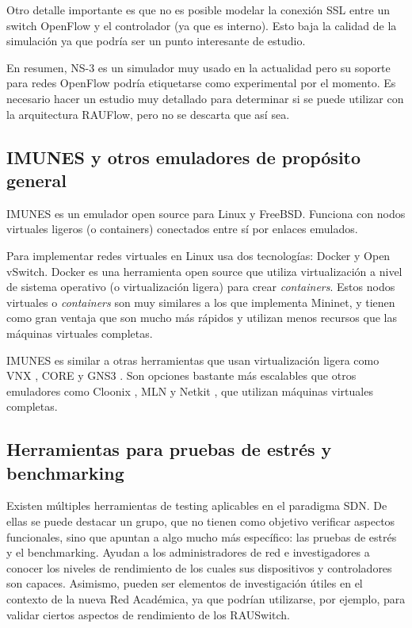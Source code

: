 Otro detalle importante es que no es posible modelar la conexión SSL entre un switch OpenFlow y el controlador (ya que es interno). Esto baja la calidad de la simulación ya que podría ser un punto interesante de estudio.

En resumen, NS-3 es un simulador muy usado en la actualidad pero su soporte para redes OpenFlow podría etiquetarse como experimental por el momento. Es necesario hacer un estudio muy detallado para determinar si se puede utilizar con la arquitectura RAUFlow, pero no se descarta que así sea.

\subsection{IMUNES y otros emuladores de propósito general}
IMUNES \cite{imunes} es un emulador open source para Linux y FreeBSD. Funciona con nodos virtuales ligeros (o containers) conectados entre sí por enlaces emulados.

Para implementar redes virtuales en Linux usa dos tecnologías: Docker y Open vSwitch. Docker es una herramienta open source que utiliza virtualización a nivel de sistema operativo (o virtualización ligera) para crear \textit{containers}. Estos nodos virtuales o \textit{containers} son muy similares a los que implementa Mininet, y tienen como gran ventaja que son mucho más rápidos y utilizan menos recursos que las máquinas virtuales completas.

IMUNES es similar a otras herramientas que usan virtualización ligera como VNX \cite{vnx}, CORE \cite{core} y GNS3 \cite{gns3}. Son opciones bastante más escalables que otros emuladores como Cloonix \cite{cloonix}, MLN \cite{mln} y Netkit \cite{netkit}, que utilizan máquinas virtuales completas.

\subsection{Herramientas para pruebas de estrés y benchmarking}
Existen múltiples herramientas de testing aplicables en el paradigma SDN. De ellas se puede destacar un grupo, que no tienen como objetivo verificar aspectos funcionales, sino que apuntan a algo mucho más específico: las pruebas de estrés y el benchmarking. Ayudan a los administradores de red e investigadores a conocer los niveles de rendimiento de los cuales sus dispositivos y controladores son capaces. Asimismo, pueden ser elementos de investigación útiles en el contexto de la nueva Red Académica, ya que podrían utilizarse, por ejemplo, para validar ciertos aspectos de rendimiento de los RAUSwitch.

